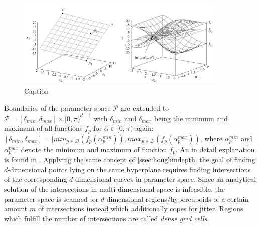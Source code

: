 \begin{figure}
    \centering
    \includegraphics[width=0.9\textwidth]{figures/cash3d.png}
    \caption{Caption}
    \label{fig:my_label}
\end{figure}

Boundaries of the parameter space $\mathcal{P}$ are extended to $\mathcal{P} = [\delta_{min}, \delta_{max}]\times [0,\pi)^{d-1}$ with $\delta_{min}$ and $\delta_{max}$ being the minimum and maximum of all functions $f_p$ for $\alpha \in [0,\pi)$ again: $[\delta_{min}, \delta_{max}] = [min_{p \in \mathcal{D}}(f_p(\alpha_p^{min})), max_{p \in \mathcal{D}}(f_p(\alpha_p^{max}))$, where $\alpha_p^{min}$ and $\alpha_p^{max}$ denote the minimum and maximum of function $f_p$. An in detail explanation is found in \textcite{CASHachtert2008robust}.
Applying the same concept of \autoref{ssec:houghindepth} the goal of finding $d$-dimensional points lying on the same hyperplane requires finding intersections of the corresponding $d$-dimensional curves in parameter space. Since an analytical solution of the intersections in multi-dimensional space is infeasible, the parameter space is scanned for $d$-dimensional regions/hypercuboids of a certain amount $m$ of intersections instead which additionally copes for jitter. Regions which fulfill the number of intersections are called \textit{dense grid cells}.


